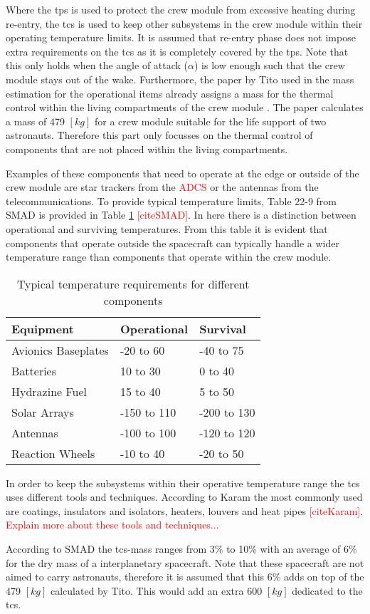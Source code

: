 Where the \acrfull{tps} is used to protect the crew module from excessive heating during re-entry, the \acrfull{tcs} is used to keep other subsystems in the crew module within their operating temperature limits. It is assumed that re-entry phase does not impose extra requirements on the \gls{tcs} as it is completely covered by the \gls{tps}. Note that this only holds when the angle of attack ($\alpha$) is low enough such that the crew module stays out of the wake. Furthermore, the paper by Tito used in the mass estimation for the operational items already assigns a mass for the thermal control within the living compartments of the crew module \cite{Tito2013}. The paper calculates a mass of 479 $[kg]$ for a crew module suitable for the life support of two astronauts. Therefore this part only focusses on the thermal control of components that are not placed within the living compartments.

Examples of these components that need to operate at the edge or outside of the crew module are star trackers from the \textcolor{red}{ADCS} or the antennas from the telecommunications. To provide typical temperature limits, Table 22-9 from SMAD is provided in Table \ref{tab:cmtherm} \textcolor{red}{[citeSMAD]}. In here there is a distinction between operational and surviving temperatures. From this table it is evident that components that operate outside the spacecraft can typically handle a wider temperature range than components that operate within the crew module.

\begin{table}[h]
	\centering
	\caption{Typical temperature requirements for different components}
	\begin{tabular}{|l|ll|}
		\hline
		\textbf{Equipment} & \textbf{Operational} & \textbf{Survival}\\ \hline \hline
		Avionics Baseplates & -20 to 60 & -40 to 75 \\
		Batteries & 10 to 30 & 0 to 40 \\
		Hydrazine Fuel & 15 to 40 & 5 to 50 \\
		Solar Arrays & -150 to 110 & -200 to 130 \\
		Antennas & -100 to 100 & -120 to 120 \\
		Reaction Wheels & -10 to 40 & -20 to 50 \\
		\hline
	\end{tabular}
	\label{tab:cmtherm}
\end{table}

In order to keep the subsystems within their operative temperature range the \gls{tcs} uses different tools and techniques. According to Karam the most commonly used are coatings, insulators and isolators, heaters, louvers and heat pipes \textcolor{red}{[citeKaram]}. \textcolor{red}{Explain more about these tools and techniques...}

According to SMAD the \gls{tcs}-mass ranges from 3\% to 10\% with an average of 6\% for the dry mass of a interplanetary spacecraft. Note that these spacecraft are not aimed to carry astronauts, therefore it is assumed that this 6\% adds on top of the 479 $[kg]$ calculated by Tito. This would add an extra 600 $[kg]$ dedicated to the \gls{tcs}.
